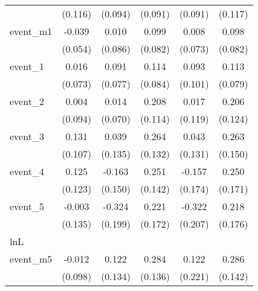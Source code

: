 {\begin{tabular}{l*{5}{c}}
            &     (0.116)         &     (0.094)         &     (0.091)         &     (0.091)         &     (0.117)         \\
[1em]
event\_m1    &      -0.039         &       0.010         &       0.099         &       0.008         &       0.098         \\
            &     (0.054)         &     (0.086)         &     (0.082)         &     (0.073)         &     (0.082)         \\
[1em]
event\_1     &       0.016         &       0.091         &       0.114         &       0.093         &       0.113         \\
            &     (0.073)         &     (0.077)         &     (0.084)         &     (0.101)         &     (0.079)         \\
[1em]
event\_2     &       0.004         &       0.014         &       0.208         &       0.017         &       0.206         \\
            &     (0.094)         &     (0.070)         &     (0.114)         &     (0.119)         &     (0.124)         \\
[1em]
event\_3     &       0.131         &       0.039         &       0.264\sym{*}  &       0.043         &       0.263         \\
            &     (0.107)         &     (0.135)         &     (0.132)         &     (0.131)         &     (0.150)         \\
[1em]
event\_4     &       0.125         &      -0.163         &       0.251         &      -0.157         &       0.250         \\
            &     (0.123)         &     (0.150)         &     (0.142)         &     (0.174)         &     (0.171)         \\
[1em]
event\_5     &      -0.003         &      -0.324         &       0.221         &      -0.322         &       0.218         \\
            &     (0.135)         &     (0.199)         &     (0.172)         &     (0.207)         &     (0.176)         \\
\hline
lnL         &                     &                     &                     &                     &                     \\
event\_m5    &      -0.012         &       0.122         &       0.284\sym{*}  &       0.122         &       0.286\sym{*}  \\
            &     (0.098)         &     (0.134)         &     (0.136)         &     (0.221)         &     (0.142)         \\

\end{tabular}}
